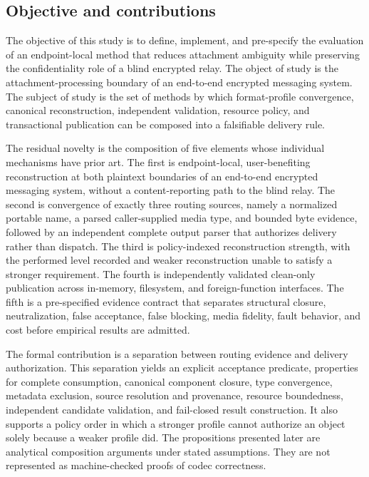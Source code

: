 \subsection{Objective and contributions}

The objective of this study is to define, implement, and pre-specify the
evaluation of an endpoint-local method that reduces attachment ambiguity while
preserving the confidentiality role of a blind encrypted relay. The object of
study is the attachment-processing boundary of an end-to-end encrypted
messaging system. The subject of study is the set of methods by which
format-profile convergence, canonical reconstruction, independent validation,
resource policy, and transactional publication can be composed into a
falsifiable delivery rule.

The residual novelty is the composition of five elements whose individual
mechanisms have prior art. The first is endpoint-local, user-benefiting
reconstruction at both plaintext boundaries of an end-to-end encrypted
messaging system, without a content-reporting path to the blind relay. The
second is convergence of exactly three routing sources, namely a normalized
portable name, a parsed caller-supplied media type, and bounded byte evidence,
followed by an independent complete output parser that authorizes delivery
rather than dispatch. The third is policy-indexed reconstruction strength, with
the performed level recorded and weaker reconstruction unable to satisfy a
stronger requirement. The fourth is independently validated clean-only
publication across in-memory, filesystem, and foreign-function interfaces. The
fifth is a pre-specified evidence contract that separates structural closure,
neutralization, false acceptance, false blocking, media fidelity, fault
behavior, and cost before empirical results are admitted.

The formal contribution is a separation between routing evidence and delivery
authorization. This separation yields an explicit acceptance predicate,
properties for complete consumption, canonical component closure, type
convergence, metadata exclusion, source resolution and provenance, resource
boundedness, independent candidate validation, and fail-closed result
construction. It also supports a policy order in which a stronger profile
cannot authorize an object solely because a weaker profile did. The
propositions presented later are analytical composition arguments under stated
assumptions. They are not represented as machine-checked proofs of codec
correctness.

